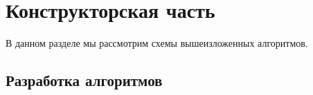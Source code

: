 \chapter{Конструкторская часть}
В данном разделе мы рассмотрим схемы вышеизложенных алгоритмов.

\section{Разработка алгоритмов}

\begin{figure}[ht!]
\end{figure}

\begin{figure}[ht!]
\end{figure}

